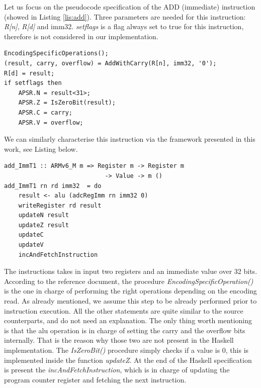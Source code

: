 \documentclass[conference]{IEEEtran}
\begin{document}
Let us focus on the pseudocode specification of the ADD (immediate) instruction (showed in
Listing \ref{lis:add}). Three parameters are needed for this instruction: \textit{R[n]},
\textit{R[d]} and imm32. \textit{setflags} is a flag always set to true for this instruction,
therefore is not considered in our implementation.\\

\begin{lstlisting}[caption=ADD (immediate) instruction - Reference specification,
frame=single, label=lis:add]
EncodingSpecificOperations();
(result, carry, overflow) = AddWithCarry(R[n], imm32, '0');
R[d] = result;
if setflags then
	APSR.N = result<31>;
	APSR.Z = IsZeroBit(result);
	APSR.C = carry;
	APSR.V = overflow;
\end{lstlisting}

\noindent
We can similarly characterise this instruction via the framework presented in this work,
see Listing below.\\

\begin{lstlisting}[caption=ADD (immediate) instruction - Haskell-based specification,
frame=single, label=lis:addH]
add_ImmT1 :: ARMv6_M m => Register m -> Register m
							-> Value -> m ()
add_ImmT1 rn rd imm32  = do
    result <- alu (adcRegImm rn imm32 0)
    writeRegister rd result
    updateN result
    updateZ result
    updateC
    updateV
    incAndFetchInstruction
\end{lstlisting}

\noindent
The instructions takes in input two registers and an immediate value over 32 bits. According
to the reference document, the procedure \textit{EncodingSpecificOperation()} is the one in
charge of performing the right operations depending on the encoding read. As already
mentioned, we assume this step to be already performed prior to instruction execution. All
the other statements are quite similar to the source counterparts, and do not need an
explanation. The only thing worth mentioning is that the alu operation is in charge of
setting the carry and the overflow bits internally. That is the reason why those two are not
present in the Haskell implementation. The \textit{IsZeroBit()} procedure simply checks if a
value is 0, this is implemented inside the function \textit{updateZ}. At the end of the
Haskell specification is present the \textit{incAndFetchInstruction}, which is in charge of
updating the program counter register and fetching the next instruction.
\end{document}
